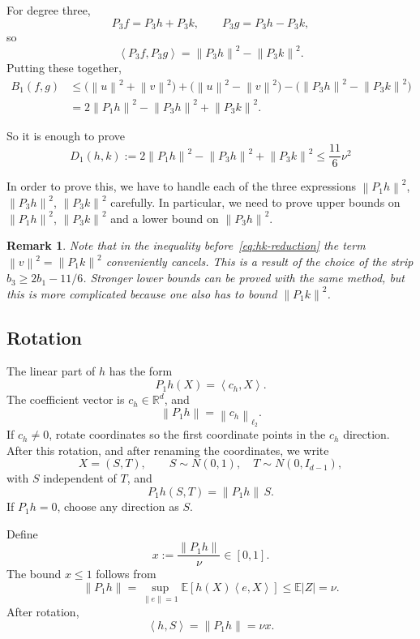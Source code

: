 \documentclass[11pt]{article}
\newtheorem{remark}[theorem]{Remark}
\numberwithin{equation}{section}
\newcommand{\R}{\mathbb R}
\newcommand{\E}{\mathbb E}
\newcommand{\ip}[2]{\left\langle #1,#2\right\rangle}
\newcommand{\norm}[1]{\left\|#1\right\|}
\begin{document}
For degree three,
\[
        P_3f=P_3h+P_3k,
        \qquad
        P_3g=P_3h-P_3k,
\]
so
\[
        \ip{P_3f}{P_3g}=\norm{P_3h}^2-\norm{P_3k}^2.
\]
Putting these together,
\begin{align*}
        B_1(f,g)
        &\le
        \bigl(\norm{u}^2+\norm{v}^2\bigr)
        +\bigl(\norm{u}^2-\norm{v}^2\bigr)
        -\bigl(\norm{P_3h}^2-\norm{P_3k}^2\bigr)\\
        &=2\norm{P_1h}^2-\norm{P_3h}^2+\norm{P_3k}^2.
\end{align*}

So it is enough to prove
\begin{equation}
\boxed{\displaystyle
        D_1(h,k):=2\norm{P_1h}^2-\norm{P_3h}^2+\norm{P_3k}^2
        \le \frac{11}{6}\nu^2
}
\label{eq:hk-reduction}
\end{equation}

In order to prove this, we have to handle each of the three expressions $\norm{P_1h}^2$, $\norm{P_3h}^2$, $\norm{P_3k}^2$ carefully. In particular, we need to prove upper bounds on $\norm{P_1h}^2$, $\norm{P_3k}^2$ and a lower bound on $\norm{P_3h}^2$.

\begin{remark}
    Note that in the inequality before~\eqref{eq:hk-reduction} the term $\norm{v}^2=\norm{P_1k}^2$ conveniently cancels. This is a result of the choice of the strip $b_3\ge 2b_1-11/6$. Stronger lower bounds can be proved with the same method, but this is more complicated because one also has to bound $\norm{P_1k}^2$.
\end{remark}

\subsection{Rotation}
\label{sec:rotation}

The linear part of $h$ has the form
\[
        P_1h(X)=\ip{c_h}{X}.
\]
The coefficient vector is $c_h\in\R^d$, and
\[
        \norm{P_1h}=\norm{c_h}_{\ell_2}.
\]
If $c_h\neq0$, rotate coordinates so the first coordinate points in the $c_h$ direction. After this rotation, and after renaming the coordinates, we write
\[
        X=(S,T),
        \qquad S\sim N(0,1),\quad T\sim N(0,I_{d-1}),
\]
with $S$ independent of $T$, and
\[
        P_1h(S,T)=\norm{P_1h}\,S.
\]
If $P_1h=0$, choose any direction as $S$.

Define
\[
        x:=\frac{\norm{P_1h}}{\nu}\in[0,1].
\]
The bound $x\le1$ follows from
\[
        \norm{P_1h}=\sup_{\norm{e}=1}\E[h(X)\ip{e}{X}]
        \le \E|Z|=\nu.
\]
After rotation,
\[
        \ip{h}{S}=\norm{P_1h}=\nu x.
\]
\end{document}
